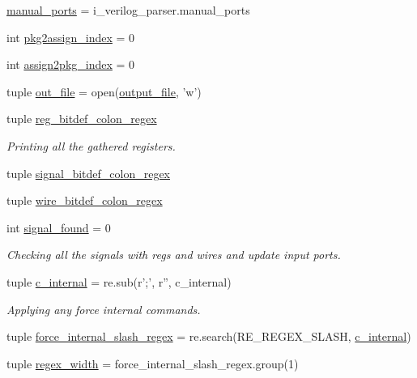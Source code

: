 \begin{DoxyCompactItemize}
\hyperlink{namespaceveripy_a9a896686fd9fe466ad77dc1090ca93aa}{manual\-\_\-ports} = i\-\_\-verilog\-\_\-parser.\-manual\-\_\-ports
\item 
int \hyperlink{namespaceveripy_ad519db7b0f685cc6c804c7ecc3bc02b5}{pkg2assign\-\_\-index} = 0
\item 
int \hyperlink{namespaceveripy_ae065d2f646ed5d1156a25bb21084cbd6}{assign2pkg\-\_\-index} = 0
\item 
tuple \hyperlink{namespaceveripy_a680636d6f9937fd2b1957fd55a5389b8}{out\-\_\-file} = open(\hyperlink{namespaceveripy_acf3a579572b494d5b9d6ec35c9df7688}{output\-\_\-file}, 'w')
\item 
tuple \hyperlink{namespaceveripy_ab36a4deea02c6b2d407e6896250e385c}{reg\-\_\-bitdef\-\_\-colon\-\_\-regex}
\begin{DoxyCompactList}\small\item\em Printing all the gathered registers. \end{DoxyCompactList}\item 
tuple \hyperlink{namespaceveripy_a4eec11a6d141b0afa891ea1ebd3c48ed}{signal\-\_\-bitdef\-\_\-colon\-\_\-regex}
\item 
tuple \hyperlink{namespaceveripy_aa33d8fd3035f8d40742a86cdcabd1507}{wire\-\_\-bitdef\-\_\-colon\-\_\-regex}
\item 
int \hyperlink{namespaceveripy_ad2d051929b4f3a74a076b081dddd2c84}{signal\-\_\-found} = 0
\begin{DoxyCompactList}\small\item\em Checking all the signals with regs and wires and update input ports. \end{DoxyCompactList}\item 
tuple \hyperlink{namespaceveripy_ad5d479254f68163a413f993072a21670}{c\-\_\-internal} = re.\-sub(r';', r'', c\-\_\-internal)
\begin{DoxyCompactList}\small\item\em Applying any force internal commands. \end{DoxyCompactList}\item 
tuple \hyperlink{namespaceveripy_a06e433e8b950a487545be60f952e0667}{force\-\_\-internal\-\_\-slash\-\_\-regex} = re.\-search(R\-E\-\_\-\-R\-E\-G\-E\-X\-\_\-\-S\-L\-A\-S\-H, \hyperlink{namespaceveripy_ad5d479254f68163a413f993072a21670}{c\-\_\-internal})
\item 
tuple \hyperlink{namespaceveripy_a5e677540fde9f9052f3c7c5a7d12243c}{regex\-\_\-width} = force\-\_\-internal\-\_\-slash\-\_\-regex.\-group(1)
\item 

\end{DoxyCompactItemize}
